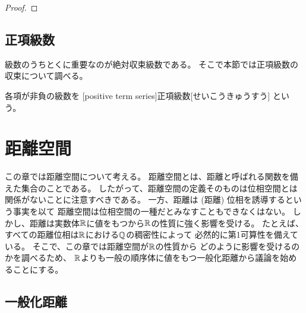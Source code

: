 \documentclass[report]{jlreq}
\begin{document}
\begin{proof}
    \TODO{}
\end{proof}

%
\section{正項級数}

級数のうちとくに重要なのが絶対収束級数である。
そこで本節では正項級数の収束について調べる。

\begin{definition}[正項級数]
    各項が非負の級数を
    [positive term series]{正項級数}[せいこうきゅうすう]
    という。
\end{definition}





%
\chapter{距離空間}

この章では距離空間について考える。
距離空間とは、距離と呼ばれる関数を備えた集合のことである。
したがって、距離空間の定義そのものは位相空間とは関係がないことに注意すべきである。
一方、距離は (距離) 位相を誘導するという事実を以て
距離空間は位相空間の一種だとみなすこともできなくはない。
しかし、距離は実数体$\mathbb{R}$に値をもつから$\mathbb{R}$の性質に強く影響を受ける。
たとえば、すべての距離位相は$\mathbb{R}$における$\mathbb{Q}$の稠密性によって
必然的に第1可算性を備えている。
そこで、この章では距離空間が$\mathbb{R}$の性質から
どのように影響を受けるのかを調べるため、
$\mathbb{R}$よりも一般の順序体に値をもつ一般化距離から議論を始めることにする。

%
\section{一般化距離}
\end{document}
